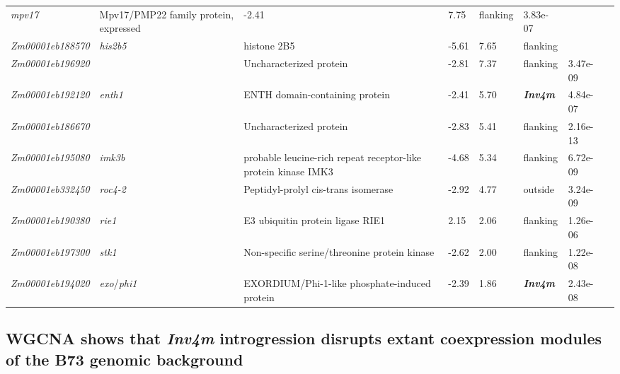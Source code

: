 \documentclass[9pt,twocolumn,twoside]{rilabRxiv}
\newcommand{\invfour}{\textit{Inv4m}\xspace}
\begin{document}
\begin{table}[!ht]
{\begin{tabular}{llllllll}
  \textit{mpv17} &
  Mpv17/PMP22 family protein, expressed &
  -2.41 &
  7.75 &
  flanking &
  3.83e-07 &
  \cite{liu2023, peiffer2014} \\
  \textit{Zm00001eb188570} &
  \textit{his2b5} &
  histone 2B5 &
  -5.61 &
  7.65 &
  flanking &
   &
  \cite{liu2023} \\
  \textit{Zm00001eb196920} &
   &
  Uncharacterized protein &
  -2.81 &
  7.37 &
  flanking &
  3.47e-09 &
  \cite{liu2023, peiffer2014} \\
  \textit{Zm00001eb192120} &
  \textit{enth1} &
  ENTH domain-containing protein &
  -2.41 &
  5.70 &
  \textbf{\invfour} &
  4.84e-07 &
  \cite{liu2023, peiffer2014} \\
  \textit{Zm00001eb186670} &
   &
  Uncharacterized protein &
  -2.83 &
  5.41 &
  flanking &
  2.16e-13 &
  \cite{liu2023, peiffer2014} \\
  \textit{Zm00001eb195080} &
  \textit{imk3b} &
  probable leucine-rich repeat receptor-like protein kinase IMK3 &
  -4.68 &
  5.34 &
  flanking &
  6.72e-09 &
  \cite{liu2023, peiffer2014} \\
  \textit{Zm00001eb332450} &
  \textit{roc4-2} &
  Peptidyl-prolyl cis-trans isomerase &
  -2.92 &
  4.77 &
  outside &
  3.24e-09 &
  \cite{liu2023, peiffer2014} \\
  \textit{Zm00001eb190380} &
  \textit{rie1} &
  E3 ubiquitin protein ligase RIE1 &
  2.15 &
  2.06 &
  flanking &
  1.26e-06 &
  \cite{liu2023} \\
  \textit{Zm00001eb197300} &
  \textit{stk1} &
  Non-specific serine/threonine protein kinase &
  -2.62 &
  2.00 &
  flanking &
  1.22e-08 &
  \cite{liu2023, peiffer2014} \\
  \textit{Zm00001eb194020} &
  \textit{exo}/\textit{phi1} &
  EXORDIUM/Phi-1-like phosphate-induced protein &
  -2.39 &
  1.86 &
  \textbf{\invfour} &
  2.43e-08 &
  \cite{liu2023, peiffer2014} \\
 \bottomrule
\end{tabular}%
}
\end{table}


\subsection{WGCNA shows that \invfour introgression disrupts extant coexpression modules of the B73 genomic background}
\end{document}

